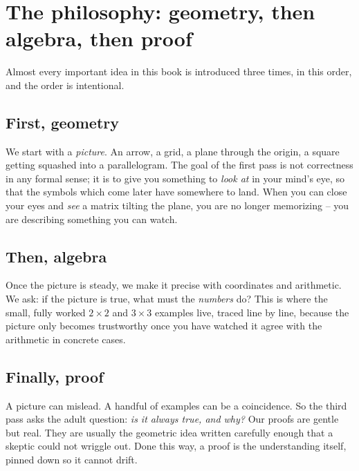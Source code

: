 \section*{The philosophy: geometry, then algebra, then proof}

Almost every important idea in this book is introduced three times, in this order,
and the order is intentional.

\subsection*{First, geometry}

We start with a \emph{picture}. An arrow, a grid, a plane through the origin, a
square getting squashed into a parallelogram. The goal of the first pass is not
correctness in any formal sense; it is to give you something to \emph{look at} in
your mind's eye, so that the symbols which come later have somewhere to land. When
you can close your eyes and \emph{see} a matrix tilting the plane, you are no
longer memorizing -- you are describing something you can watch.

\subsection*{Then, algebra}

Once the picture is steady, we make it precise with coordinates and arithmetic. We
ask: if the picture is true, what must the \emph{numbers} do? This is where the
small, fully worked $2\times 2$ and $3\times 3$ examples live, traced line by
line, because the picture only becomes trustworthy once you have watched it agree
with the arithmetic in concrete cases.

\subsection*{Finally, proof}

A picture can mislead. A handful of examples can be a coincidence. So the third
pass asks the adult question: \emph{is it always true, and why?} Our proofs are
gentle but real. They are usually the geometric idea written carefully enough
that a skeptic could not wriggle out. Done this way, a proof is the understanding
itself, pinned down so it cannot drift.


